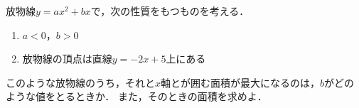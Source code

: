 \documentclass[../../main.tex]{subfiles}
\begin{document}
放物線$y=ax^2+bx$で，次の性質をもつものを考える．
\begin{enumerate}
  \item [\ding{"AC}]$a<0$，$b>0$
  \item [\ding{"AD}]放物線の頂点は直線$y=-2x+5$上にある
\end{enumerate}
このような放物線のうち，それと$x$軸とが囲む面積が最大になるのは，$b$がどのような値をとるときか．
また，そのときの面積を求めよ．
\end{document}
